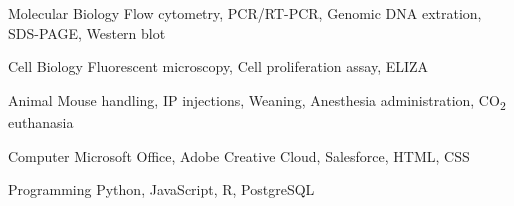 

\begin{cvskills}

  \cvskill
    {Molecular Biology} %
    {Flow cytometry, PCR/RT-PCR, Genomic DNA extration, SDS-PAGE, Western blot} %

  \cvskill
    {Cell Biology} %
    {Fluorescent microscopy, Cell proliferation assay, ELIZA} %

  \cvskill
    {Animal} %
    {Mouse handling, IP injections, Weaning, Anesthesia administration, CO\textsubscript{2} euthanasia } %

  \cvskill
    {Computer} %
    {Microsoft Office, Adobe Creative Cloud, Salesforce, HTML, CSS} %

  \cvskill
    {Programming} %
    {Python, JavaScript, R, PostgreSQL} %

\end{cvskills}

